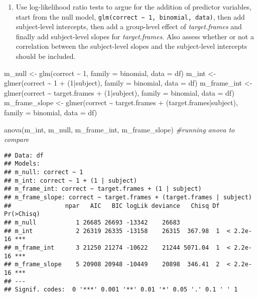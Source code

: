 \documentclass[
]{article}
\newenvironment{Shaded}{\begin{snugshade}}{\end{snugshade}}
\newcommand{\AttributeTok}[1]{\textcolor[rgb]{0.77,0.63,0.00}{#1}}
\newcommand{\CommentTok}[1]{\textcolor[rgb]{0.56,0.35,0.01}{\textit{#1}}}
\newcommand{\DecValTok}[1]{\textcolor[rgb]{0.00,0.00,0.81}{#1}}
\newcommand{\FunctionTok}[1]{\textcolor[rgb]{0.00,0.00,0.00}{#1}}
\newcommand{\NormalTok}[1]{#1}
\newcommand{\OtherTok}[1]{\textcolor[rgb]{0.56,0.35,0.01}{#1}}
\newcommand{\SpecialCharTok}[1]{\textcolor[rgb]{0.00,0.00,0.00}{#1}}
\providecommand{\tightlist}{%
  \setlength{\itemsep}{0pt}\setlength{\parskip}{0pt}}
\begin{document}
\begin{enumerate}
\def\labelenumi{\arabic{enumi})}
\setcounter{enumi}{1}
\tightlist
\item
  Use log-likelihood ratio tests to argue for the addition of predictor
  variables, start from the null model,
  \texttt{glm(correct\ \textasciitilde{}\ 1,\ \textquotesingle{}binomial\textquotesingle{},\ data)},
  then add subject-level intercepts, then add a group-level effect of
  \emph{target.frames} and finally add subject-level slopes for
  \emph{target.frames}. Also assess whether or not a correlation between
  the subject-level slopes and the subject-level intercepts should be
  included.
\end{enumerate}

\begin{Shaded}
\begin{Highlighting}[]
\NormalTok{m\_null }\OtherTok{\textless{}{-}} \FunctionTok{glm}\NormalTok{(correct }\SpecialCharTok{\textasciitilde{}} \DecValTok{1}\NormalTok{, }\AttributeTok{family =}\NormalTok{ binomial, }\AttributeTok{data =}\NormalTok{ df)}
\NormalTok{m\_int }\OtherTok{\textless{}{-}} \FunctionTok{glmer}\NormalTok{(correct }\SpecialCharTok{\textasciitilde{}} \DecValTok{1} \SpecialCharTok{+}\NormalTok{ (}\DecValTok{1}\SpecialCharTok{|}\NormalTok{subject), }\AttributeTok{family =}\NormalTok{ binomial, }\AttributeTok{data =}\NormalTok{ df)}
\NormalTok{m\_frame\_int }\OtherTok{\textless{}{-}} \FunctionTok{glmer}\NormalTok{(correct }\SpecialCharTok{\textasciitilde{}}\NormalTok{ target.frames }\SpecialCharTok{+}\NormalTok{ (}\DecValTok{1}\SpecialCharTok{|}\NormalTok{subject), }\AttributeTok{family =}\NormalTok{ binomial, }\AttributeTok{data =}\NormalTok{ df)}
\NormalTok{m\_frame\_slope }\OtherTok{\textless{}{-}} \FunctionTok{glmer}\NormalTok{(correct }\SpecialCharTok{\textasciitilde{}}\NormalTok{ target.frames }\SpecialCharTok{+}\NormalTok{ (target.frames}\SpecialCharTok{|}\NormalTok{subject), }\AttributeTok{family =}\NormalTok{ binomial, }\AttributeTok{data =}\NormalTok{ df) }

\FunctionTok{anova}\NormalTok{(m\_int, m\_null, m\_frame\_int, m\_frame\_slope) }\CommentTok{\#running anova to compare}
\end{Highlighting}
\end{Shaded}

\begin{verbatim}
## Data: df
## Models:
## m_null: correct ~ 1
## m_int: correct ~ 1 + (1 | subject)
## m_frame_int: correct ~ target.frames + (1 | subject)
## m_frame_slope: correct ~ target.frames + (target.frames | subject)
##               npar   AIC   BIC logLik deviance   Chisq Df Pr(>Chisq)    
## m_null           1 26685 26693 -13342    26683                          
## m_int            2 26319 26335 -13158    26315  367.98  1  < 2.2e-16 ***
## m_frame_int      3 21250 21274 -10622    21244 5071.04  1  < 2.2e-16 ***
## m_frame_slope    5 20908 20948 -10449    20898  346.41  2  < 2.2e-16 ***
## ---
## Signif. codes:  0 '***' 0.001 '**' 0.01 '*' 0.05 '.' 0.1 ' ' 1
\end{verbatim}
\end{document}
